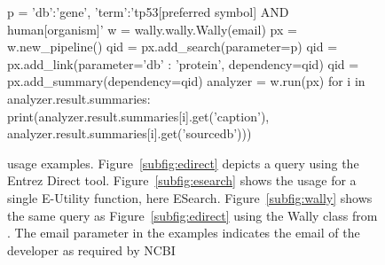 \begin{figure}
\begin{lrbox}{\mylistingboxIII}
\begin{python}
p = {'db':'gene', 'term':'tp53[preferred symbol] AND human[organism]'}
w = wally.wally.Wally(email)
px = w.new_pipeline()
qid = px.add_search(parameter=p)
qid = px.add_link(parameter={'db' : 'protein'}, dependency=qid)
qid = px.add_summary(dependency=qid)
analyzer = w.run(px)
for i in analyzer.result.summaries:
  print(analyzer.result.summaries[i].get('caption'),
        analyzer.result.summaries[i].get('sourcedb')))
\end{python}%
  \end{lrbox}%
  \caption{\entrezpy usage examples. Figure~\ref{subfig:edirect} depicts a query
           using the Entrez Direct tool. Figure~\ref{subfig:esearch} shows
           the usage for a single E-Utility function, here ESearch.
           Figure~\ref{subfig:wally} shows the same query as
           Figure~\ref{subfig:edirect} using the Wally class from \entrezpy. The
           email parameter in the \entrezpy examples indicates the email of the
           developer as required by NCBI
  \label{fig:entrezpy_examples}}
\end{figure}
